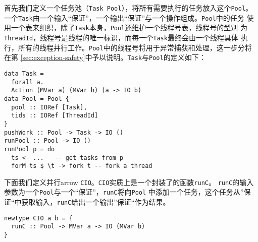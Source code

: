 \documentclass[conference]{IEEEtran}
\begin{document}
首先我们定义一个任务池（\texttt{Task Pool}），将所有需要执行的任务放入这个\texttt{Pool}。
一个\texttt{Task}由一个输入“保证”，一个输出“保证”与一个操作组成。\texttt{Pool}中的任务
使用一个表来组织，除了\texttt{Task}本身，\texttt{Pool}还维护一个线程号表，线程号的型别
为\texttt{ThreadId}，线程号是线程的唯一标识，而每一个\texttt{Task}最终会由一个线程具体
执行，所有的线程并行工作。\texttt{Pool}中的线程号将用于异常捕获和处理，这一步分将在第
\ref{sec:exception-safety}中予以说明。\texttt{Task}与\texttt{Pool}的定义如下：
\begin{verbatim}
data Task = 
  forall a.
  Action (MVar a) (MVar b) (a -> IO b)
data Pool = Pool {
  pool :: IORef [Task],
  tids :: IORef [ThreadId]
}
pushWork :: Pool -> Task -> IO ()
runPool :: Pool -> IO ()
runPool p = do
  ts <- ...   -- get tasks from p
  forM ts $ \t -> fork t -- fork a thread
\end{verbatim}

下面我们定义并行arrow \texttt{CIO}。\texttt{CIO}实质上是一个封装了的函数\texttt{runC}。
\texttt{runC}的输入参数为一个\texttt{Pool}与一个“保证”，\texttt{runC}将向\texttt{Pool}
中添加一个任务，这个任务从”保证“中获取输入，\texttt{runC}给出一个输出”保证“作为结果。
\begin{verbatim}
newtype CIO a b = {
  runC :: Pool -> MVar a -> IO (MVar b)
}
\end{verbatim}
\end{document}
